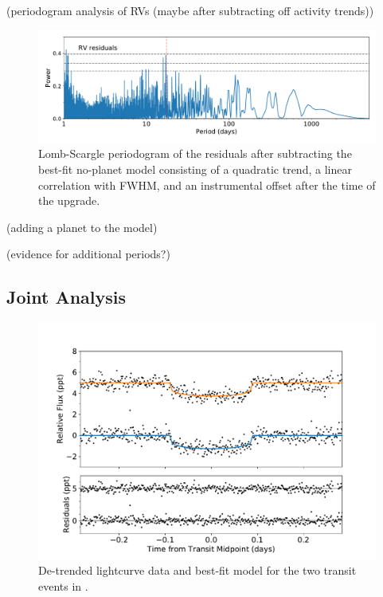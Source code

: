 \documentclass[modern]{aastex62}
\begin{document}
(periodogram analysis of RVs (maybe after subtracting off activity trends))

\begin{figure}
    \centering
    \includegraphics[width=\textwidth]{periodogram_resids1.pdf}
    \caption{Lomb-Scargle periodogram of the \RV residuals after subtracting the best-fit no-planet model consisting of a quadratic trend, a linear correlation with FWHM, and an instrumental offset after the time of the \HARPS upgrade.}
    \label{fig:periodogram_resids1}
\end{figure}

(adding a planet to the model)

(evidence for additional periods?)

\subsection{Joint Analysis}
\label{s:analysis:joint}

\begin{figure}
    \centering
    \includegraphics[width=\textwidth]{transits.pdf}
    \caption{De-trended lightcurve data and best-fit model for the two transit events in \TESS.}
    \label{fig:transits}
\end{figure}
\end{document}

